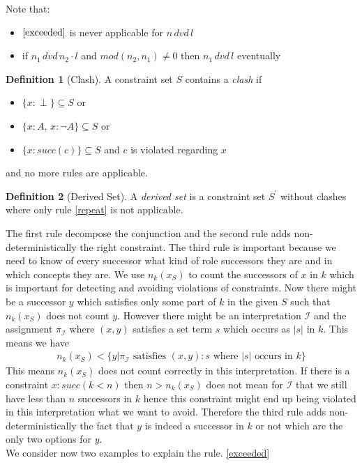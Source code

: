 \documentclass[a4paper,11pt]{scrartcl}
\theoremstyle{break}
\theoremstyle{definition}
\newtheorem{mydef}{Definition}
\begin{document}
Note that:
\begin{itemize}
\item $\ref{exceeded}$ is never applicable for $n\, dvd\, l$
\item if  $n_1\,dvd\,n_2\cdot l$ and $mod(n_2,n_1)\neq 0$ then $n_1\,dvd\,l$ eventually
\end{itemize}
\begin{mydef}[Clash]
A constraint set $S$ contains a \textit{clash} if
\begin{itemize}
\item $\{x:\perp\}\subseteq S$ or
\item $\{x:A,\,x:\neg A\}\subseteq S$ or
\item $\{x:succ(c)\}\subseteq S$ and $c$ is violated regarding $x$
\end{itemize}
and no more rules are applicable.
\end{mydef}
\begin{mydef}[Derived Set]
A \textit{derived set} is a constraint set $S^\prime$ without clashes where only rule \ref{repeat} is not applicable.
\end{mydef}
The first rule decompose the conjunction and the second rule adds non-deterministically the right constraint. The third rule is important because we need to know of every successor what kind of role successors they are and in which concepts they are. We use $n_k(x_S)$ to count the successors of $x$ in $k$ which is important for detecting and avoiding violations of constraints. Now there might be a successor $y$ which satisfies only some part of $k$ in the given $S$ such that $n_k(x_S)$ does not count $y$. However there might be an interpretation $\mathcal{I}$ and the assignment $\pi_\mathcal{I}$ where $(x,y)$ satisfies a set term $s$ which occurs as $|s|$ in $k$. This means we have
\begin{align*}
n_k(x_S)<\{y|\pi_\mathcal{I}\text{ satisfies } (x,y):s\text{ where } |s| \text{ occurs in } k\}
\end{align*}
This means $n_k(x_S)$ does not count correctly in this interpretation. If there is a constraint $x:succ(k<n)$ then $n>n_k(x_S)$ does not mean for $\mathcal{I}$ that we still have less than $n$ successors in $k$ hence this constraint might end up being violated in this interpretation what we want to avoid. Therefore the third rule adds non-deterministically the fact that $y$ is indeed a successor in $k$ or not which are the only two options for $y$.\\
We consider now two examples to explain the rule. \ref{exceeded}
\end{document}
